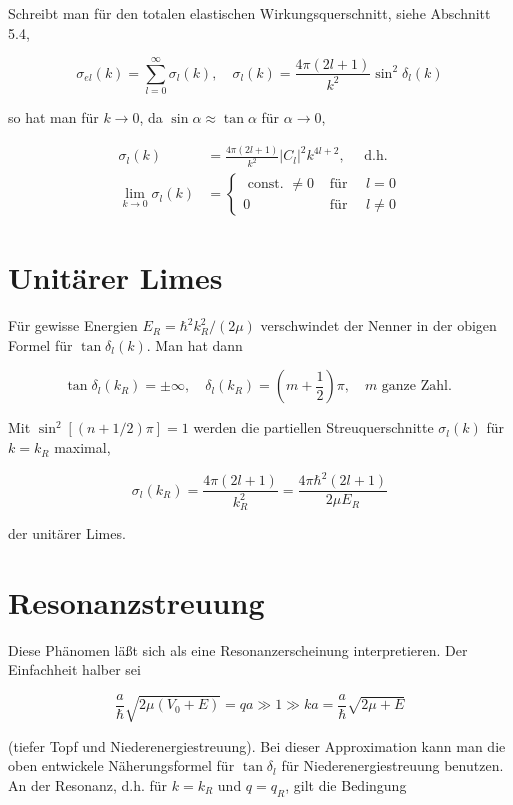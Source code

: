 \documentclass[10pt, letterpaper]{article}
\begin{document}
Schreibt man für den totalen elastischen Wirkungsquerschnitt, siehe Abschnitt 5.4,

$$
\sigma_{e l}(k)=\sum_{l=0}^{\infty} \sigma_{l}(k), \quad \sigma_{l}(k)=\frac{4 \pi(2 l+1)}{k^{2}} \sin ^{2} \delta_{l}(k)
$$

so hat man für $k \rightarrow 0$, da $\sin \alpha \approx \tan \alpha$ für $\alpha \rightarrow 0$,

$$
\begin{aligned}
\sigma_{l}(k) & =\frac{4 \pi(2 l+1)}{k^{2}}\left|C_{l}\right|^{2} k^{4 l+2}, \quad \text { d.h. } \\
\lim _{k \rightarrow 0} \sigma_{l}(k) & = \begin{cases}\text { const. } \neq 0 & \text { für } \quad l=0 \\
0 & \text { für } \quad l \neq 0\end{cases}
\end{aligned}
$$

\section*{Unitärer Limes}
Für gewisse Energien $E_{R}=\hbar^{2} k_{R}^{2} /(2 \mu)$ verschwindet der Nenner in der obigen Formel für $\tan \delta_{l}(k)$. Man hat dann

$$
\tan \delta_{l}\left(k_{R}\right)= \pm \infty, \quad \delta_{l}\left(k_{R}\right)=\left(m+\frac{1}{2}\right) \pi, \quad m \text { ganze Zahl. }
$$

Mit $\sin ^{2}[(n+1 / 2) \pi]=1$ werden die partiellen Streuquerschnitte $\sigma_{l}(k)$ für $k=k_{R}$ maximal,

$$
\sigma_{l}\left(k_{R}\right)=\frac{4 \pi(2 l+1)}{k_{R}^{2}}=\frac{4 \pi \hbar^{2}(2 l+1)}{2 \mu E_{R}}
$$

der unitärer Limes.

\section*{Resonanzstreuung}
Diese Phänomen läßt sich als eine Resonanzerscheinung interpretieren. Der Einfachheit halber sei

$$
\frac{a}{\hbar} \sqrt{2 \mu\left(V_{0}+E\right)}=q a \gg 1 \gg k a=\frac{a}{\hbar} \sqrt{2 \mu+E}
$$

(tiefer Topf und Niederenergiestreuung). Bei dieser Approximation kann man die oben entwickele Näherungsformel für $\tan \delta_{l}$ für Niederenergiestreuung benutzen. An der Resonanz, d.h. für $k=k_{R}$ und $q=q_{R}$, gilt die Bedingung
\end{document}
